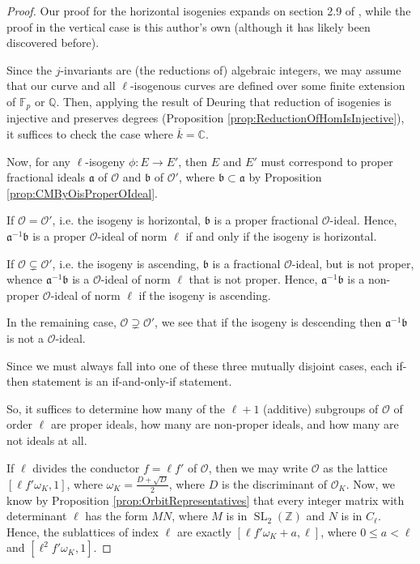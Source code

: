 \documentclass{amsart}
\theoremstyle{definition}
\theoremstyle{remark}
\numberwithin{equation}{section}
\newcommand{\cO}{\mathcal O}
\newcommand{\fka}{\mathfrak a}
\newcommand{\fkb}{\mathfrak b}
\newcommand{\bbC}{\mathbb C}
\newcommand{\bbF}{\mathbb F}
\newcommand{\bbQ}{\mathbb Q}
\newcommand{\bbZ}{\mathbb Z}
\newcommand{\inv}{^{-1}}
\DeclareMathOperator{\SL}{SL}
\begin{document}
\begin{proof}
Our proof for the horizontal isogenies expands on section 2.9 of \cite{SutherlandIV}, while the proof in the vertical case is this author's own (although it has likely been discovered before).

Since the $j$-invariants are (the reductions of) algebraic integers, we may assume that our curve and all $\ell$-isogenous curves are defined over some finite extension of $\bbF_{p}$ or $\bbQ$. Then, applying the result of Deuring that reduction of isogenies is injective and preserves degrees (Proposition \ref{prop:ReductionOfHomIsInjective}), it suffices to check the case where $\overline{k} = \bbC$.

Now, for any $\ell$-isogeny $\phi: E \to E'$, then $E$ and $E'$ must correspond to proper fractional ideals $\fka$ of $\cO$ and $\fkb$ of $\cO'$, where $\fkb \subset \fka$ by Proposition \ref{prop:CMByOisProperOIdeal}. 

If $\cO = \cO'$, i.e. the isogeny is horizontal, $\fkb$ is a proper fractional $\cO$-ideal. Hence, $\fka\inv \fkb$ is a proper $\cO$-ideal of norm $\ell$ if and only if the isogeny is horizontal.

If $\cO \subsetneq \cO'$, i.e. the isogeny is ascending, $\fkb$ is a fractional $\cO$-ideal, but is not proper, whence $\fka\inv \fkb$ is a $\cO$-ideal of norm $\ell$ that is not proper. Hence, $\fka\inv \fkb$ is a non-proper $\cO$-ideal of norm $\ell$ if the isogeny is ascending.

In the remaining case, $\cO \supsetneq \cO'$, we see that if the isogeny is descending then $\fka\inv \fkb$ is not a $\cO$-ideal.

Since we must always fall into one of these three mutually disjoint cases, each if-then statement is an if-and-only-if statement.

So, it suffices to determine how many of the $\ell + 1$ (additive) subgroups of $\cO$ of order $\ell$ are proper ideals, how many are non-proper ideals, and how many are not ideals at all.

If $\ell$ divides the conductor $f = \ell f'$ of $\cO$, then we may write $\cO$ as the lattice $[\ell f' \omega_{K}, 1]$, where $\omega_{K} = \frac{D + \sqrt{D}}{2}$, where $D$ is the discriminant of $\cO_{K}$. Now, we know by Proposition \ref{prop:OrbitRepresentatives}
that every integer matrix with determinant $\ell$ has the form $MN$, where $M$ is in $\SL_{2}(\bbZ)$ and $N$ is in $C_{\ell}$. Hence, the sublattices of index $\ell$ are exactly $[\ell f' \omega_{K} + a, \ell]$, where $0 \leq a < \ell$ and $[\ell^2 f' \omega_{K}, 1]$.


\end{proof}
\end{document}
